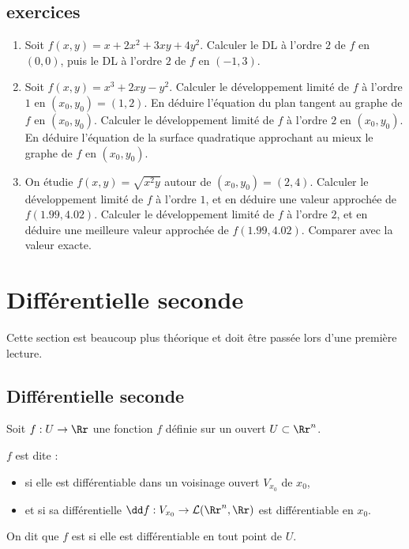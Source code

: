 \subsection{exercices}

\begin{enumerate}
     \item Soit $f(x,y) = x + 2x^2 + 3xy + 4y^2$. Calculer le DL à l'ordre $2$ de $f$ en $(0,0)$, puis le DL à l'ordre $2$ de $f$ en $(-1,3)$.

    \item Soit $f(x,y) = x^3  +2xy - y^2$. Calculer le développement limité de $f$ à l'ordre $1$ en $(x_0,y_0)=(1,2)$. En déduire l'équation du plan tangent au graphe de $f$ en $(x_0,y_0)$. Calculer le développement limité de $f$ à l'ordre $2$ en $(x_0,y_0)$. En déduire l'équation de la surface quadratique approchant au mieux le graphe de $f$ en $(x_0,y_0)$. 

    \item On étudie $f(x,y) = \sqrt{x^2y}$ autour de $(x_0,y_0)= (2,4)$.
   Calculer le développement limité de $f$ à l'ordre $1$, et en déduire une valeur approchée de $f(1.99,4.02)$. Calculer le développement limité de $f$ à l'ordre $2$, et en déduire une meilleure valeur approchée de $f(1.99,4.02)$. Comparer avec la valeur exacte.
 
\end{enumerate}



\section{Différentielle seconde}

Cette section est beaucoup plus théorique et doit être passée lors d'une première lecture.

\subsection{Différentielle seconde}


Soit $f : U \to \Rr$ une fonction $f$ définie sur un ouvert $U \subset \Rr^n$.
\begin{definition}{}{}
$f$ est dite  :
    \begin{itemize}
        \item si elle est différentiable dans un voisinage ouvert $V_{x_0}$ de $x_0$,
        \item et si sa différentielle $\dd f : V_{x_0} \to \mathcal{L}(\Rr^n,\Rr)$ est différentiable en $x_0$.
    \end{itemize}
    On dit que $f$ est  si elle est différentiable en tout point de $U$.
\end{definition} 


